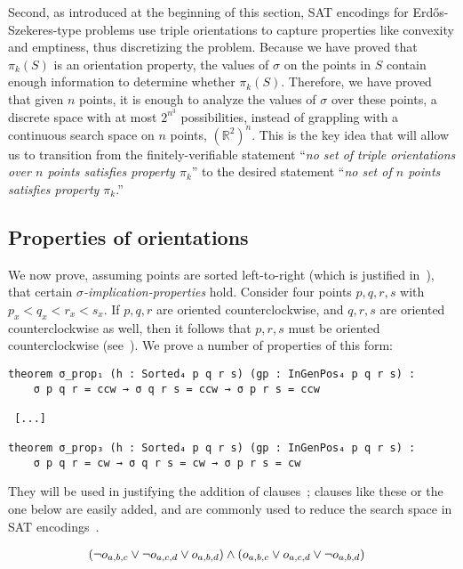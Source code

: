 Second,
as introduced at the beginning of this section,
SAT encodings for Erd\H{o}s-Szekeres-type problems use triple orientations to capture properties like convexity and emptiness,
thus discretizing the problem.
Because we have proved that $\pi_k(S)$ is an orientation property,
the values of $\sigma$ on the points in $S$ contain enough information to determine whether $\pi_k(S)$.
Therefore, we have proved that given $n$ points,
it is enough to analyze the values of $\sigma$ over these points,
a discrete space with at most $2^{n^3}$ possibilities,
instead of grappling with a continuous search space on $n$ points,
$\left(\mathbb{R}^2\right)^n$.
This is the key idea that will allow us to transition from the finitely-verifiable statement ``\emph{no set of triple orientations over $n$ points satisfies property $\pi_k$}'' to the desired statement ``\emph{no set of $n$ points satisfies property $\pi_k$}.''

\subsection{Properties of orientations}\label{sec:sigma-props}

We now prove,
assuming points are sorted left-to-right (which is justified in~),
that certain \emph{$\sigma$-implication-properties} hold.
Consider four points $p, q, r, s$ with $p_x < q_x < r_x < s_x$.
If $p, q, r$ are oriented counterclockwise,
and $q, r, s$ are oriented counterclockwise as well,
then it follows that $p, r, s$ must be oriented counterclockwise
(see~).
We prove a number of properties of this form:

\begin{lstlisting}
theorem σ_prop₁ (h : Sorted₄ p q r s) (gp : InGenPos₄ p q r s) :
    σ p q r = ccw → σ q r s = ccw → σ p r s = ccw

 [...]

theorem σ_prop₃ (h : Sorted₄ p q r s) (gp : InGenPos₄ p q r s) :
    σ p q r = cw → σ q r s = cw → σ p r s = cw
\end{lstlisting}

They will be used in justifying the addition of clauses~;
clauses like these or the one below are easily added,
and are commonly used to reduce the search space in SAT encodings~\cite{emptyHexagonNumber,scheucherTwoDisjoint5holes2020,subercaseaux2023minimizing, szekeres_peters_2006}.

\begin{align}
  &\left(\neg \orvar_{a, b, c} \lor \neg \orvar_{a, c, d} \lor \orvar_{a, b, d}\right) \land \left(\orvar_{a, b, c} \lor \orvar_{a, c, d} \lor  \neg \orvar_{a, b, d}\right)
\end{align}

